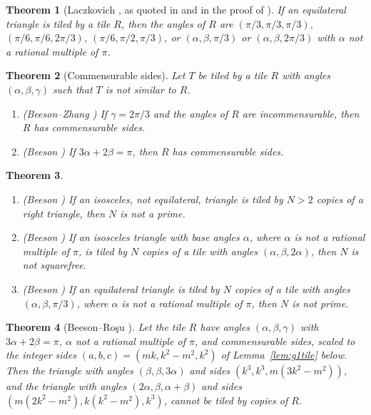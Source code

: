 \documentclass[11pt]{amsart}
\newtheorem{theorem}{Theorem}
\theoremstyle{remark}
\begin{document}
\begin{theorem}[{Laczkovich \cite[Theorem~3.3]{Lacz12}, as quoted in \cite[p.~1]{BeesonEqui} and in the proof of \cite[Theorem~3]{BR}}]\label{thm:equiclass}
If an equilateral triangle is tiled by a tile $R$, then the angles of $R$ are $(\pi/3,\pi/3,\pi/3)$, $(\pi/6,\pi/6,2\pi/3)$, $(\pi/6,\pi/2,\pi/3)$, or $(\alpha,\beta,\pi/3)$ or $(\alpha,\beta,2\pi/3)$ with $\alpha$ not a rational multiple of $\pi$.
\end{theorem}

\begin{theorem}[Commensurable sides]\label{thm:rational}
Let $T$ be tiled by a tile $R$ with angles $(\alpha,\beta,\gamma)$ such that $T$ is not similar to $R$.
\begin{enumerate}
\item[(a)] \textup{(Beeson--Zhang \cite[Theorem~1.1]{BZRat})} If $\gamma=2\pi/3$ and the angles of $R$ are incommensurable, then $R$ has commensurable sides.
\item[(b)] \textup{(Beeson \cite[Theorem~9]{Beeson2229})} If $3\alpha+2\beta=\pi$, then $R$ has commensurable sides.
\end{enumerate}
\end{theorem}

\begin{theorem}\label{thm:counts}
\begin{enumerate}
\item[(a)] \textup{(Beeson \cite[Corollary~7.9]{BeesonIso})} If an isosceles, not equilateral, triangle is tiled by $N>2$ copies of a right triangle, then $N$ is not a prime.
\item[(b)] \textup{(Beeson \cite[Theorem~11.7]{BeesonIso})} If an isosceles triangle with base angles $\alpha$, where $\alpha$ is not a rational multiple of $\pi$, is tiled by $N$ copies of a tile with angles $(\alpha,\beta,2\alpha)$, then $N$ is not squarefree.
\item[(c)] \textup{(Beeson \cite[Theorem~3]{BeesonEqui})} If an equilateral triangle is tiled by $N$ copies of a tile with angles $(\alpha,\beta,\pi/3)$, where $\alpha$ is not a rational multiple of $\pi$, then $N$ is not prime.
\end{enumerate}
\end{theorem}

\begin{theorem}[{Beeson--Ro\c{s}u \cite[Theorems~37 and~41]{BR}}]\label{thm:BR}
Let the tile $R$ have angles $(\alpha,\beta,\gamma)$ with $3\alpha+2\beta=\pi$, $\alpha$ not a rational multiple of $\pi$, and commensurable sides, scaled to the integer sides $(a,b,c)=(mk,k^2-m^2,k^2)$ of Lemma~\ref{lem:g1tile} below. Then the triangle with angles $(\beta,\beta,3\alpha)$ and sides $(k^3,k^3,m(3k^2-m^2))$, and the triangle with angles $(2\alpha,\beta,\alpha+\beta)$ and sides $(m(2k^2-m^2),k(k^2-m^2),k^3)$, cannot be tiled by copies of $R$.
\end{theorem}
\end{document}
